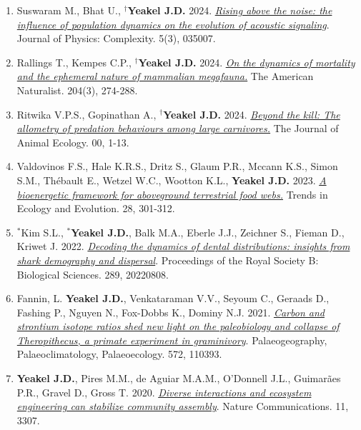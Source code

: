 \documentclass[margin,line,12pt]{res}
\begin{document}
\begin{resume}
\begin{enumerate}
\item Suswaram M., Bhat U., \textbf{${}^\dag$Yeakel J.D.} 2024. \href{https://iopscience.iop.org/article/10.1088/2632-072X/ad5e2e}{\emph{Rising above the noise: the influence of population dynamics on the evolution of acoustic signaling}}. Journal of Physics: Complexity. 5(3), 035007.

\item Rallings T., Kempes C.P., \textbf{${}^\dag$Yeakel J.D.} 2024. \href{https://www.journals.uchicago.edu/doi/abs/10.1086/731331}{\emph{On the dynamics of mortality and the ephemeral nature of mammalian megafauna.}} The American Naturalist. 204(3), 274-288.

\item Ritwika V.P.S., Gopinathan A., \textbf{${}^\dag$Yeakel J.D.} 2024. \href{https://besjournals.onlinelibrary.wiley.com/doi/10.1111/1365-2656.14070}{\emph{Beyond the kill: The allometry of predation behaviours among large carnivores.}} The Journal of Animal Ecology. 00, 1-13.

\item Valdovinos F.S., Hale K.R.S., Dritz S., Glaum P.R., Mccann K.S., Simon S.M., Thébault E., Wetzel W.C., Wootton K.L.,  \textbf{Yeakel J.D.} 2023. \href{https://www.sciencedirect.com/science/article/pii/S0169534722002841}{\emph{A bioenergetic framework for aboveground terrestrial food webs.}} Trends in Ecology and Evolution. 28, 301-312.

\item ${}^\ast$Kim S.L., \textbf{${}^\ast$Yeakel J.D.}, Balk M.A., Eberle J.J., Zeichner S., Fieman D., Kriwet J. 2022. \href{https://doi.org/10.1098/rspb.2022.0808}{\emph{Decoding the dynamics of dental distributions: insights from shark demography and dispersal}}. Proceedings of the Royal Society B: Biological Sciences. 289, 20220808.

\item Fannin, L. \textbf{Yeakel J.D.}, Venkataraman V.V., Seyoum C., Geraads D., Fashing P., Nguyen N., Fox-Dobbs K., Dominy N.J.  2021. \href{https://doi.org/10.1016/j.palaeo.2021.110393}{\emph{ Carbon and strontium isotope ratios shed new light on the paleobiology and collapse of Theropithecus, a primate experiment in graminivory}}. Palaeogeography, Palaeoclimatology, Palaeoecology. 572, 110393.

\item \textbf{Yeakel J.D.}, Pires M.M., de Aguiar M.A.M., O'Donnell J.L., Guimar\~aes P.R., Gravel D., Gross T. 2020. \href{https://www.nature.com/articles/s41467-020-17164-x}{\emph{Diverse interactions and ecosystem engineering can stabilize community assembly}}. Nature Communications. 11, 3307.


\end{enumerate}
\end{resume}
\end{document}
